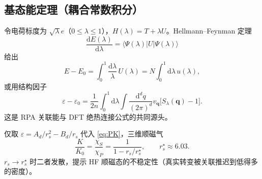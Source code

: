 \subsection{基态能定理（耦合常数积分）}

令电荷标度为 $\sqrt{\lambda}e$（$0\le\lambda\le1$），$H(\lambda)=T+\lambda U$。Hellmann--Feynman 定理
\begin{equation}
  \frac{\mathrm{d}E(\lambda)}{\mathrm{d}\lambda}
  =\bigl\langle\Psi(\lambda)|U|\Psi(\lambda)\bigr\rangle
\end{equation}
给出
\begin{equation}
  E-E_0
  =\int_0^1\frac{\mathrm{d}\lambda}{\lambda}\,
  U(\lambda)
  =N\int_0^1\mathrm{d}\lambda\,
  u(\lambda),
\label{eq:adiab}
\end{equation}
或用结构因子
\begin{equation}
  \varepsilon-\varepsilon_0
  =\frac{1}{2n}
  \int_0^1\mathrm{d}\lambda
  \int\frac{\mathrm{d}^d q}{(2\pi)^d}
  v_{\mathbf{q}}
  \bigl[S_\lambda(\mathbf{q})-1\bigr].
\label{eq:E_from_S}
\end{equation}
这是 RPA 关联能与 DFT 绝热连接公式的共同源头。

\begin{example}[HF 压缩率]
仅取 $\varepsilon=A_d/r_s^2-B_d/r_s$ 代入 \eqref{eq:PK}，三维顺磁气
\begin{equation}
  \frac{K}{K_0}
  =\frac{\chi_S}{\chi_P}
  =\frac{1}{1-r_s/r_s^\star},
  \qquad
  r_s^\star\approx6.03.
\end{equation}
$r_s\to r_s^\star$ 时二者发散，提示 HF 顺磁态的不稳定性（真实转变被关联推迟到低得多的密度）。
\end{example}
